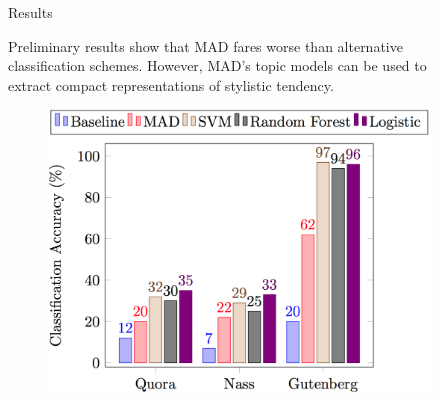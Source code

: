\documentclass[final]{beamer}
\newlength{\sepwid}
\newlength{\onecolwid}
\newlength{\twocolwid}
\begin{document}
\begin{frame}[t]
\begin{columns}[t]
\begin{column}{\twocolwid}
\begin{columns}[t,totalwidth=\twocolwid]
\begin{column}{\onecolwid}
\vspace{-29mm}
\begin{block}{Results}

Preliminary results show that MAD fares worse than alternative classification schemes. However, MAD's topic models can be used to extract compact representations of stylistic tendency.

\begin{figure}
\centering
\includegraphics[width=\linewidth]{results.png}
\end{figure}

\end{block}


\end{column} %

\end{columns} %

\end{column} %

\begin{column}{\sepwid}\end{column} %

\begin{column}{\onecolwid} %



\end{column}
\end{columns}
\end{frame}
\end{document}
